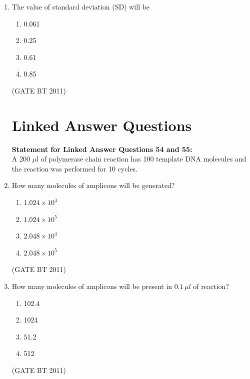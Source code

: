 \documentclass[journal,12pt,onecolumn]{IEEEtran}
\begin{document}
\begin{enumerate}
  \item The value of standard deviation (SD) will be

  \begin{multicols}{4}
    \begin{enumerate}
      \item 0.061
      \item 0.25
      \item 0.61
      \item 0.85
    \end{enumerate}
  \end{multicols} \hfill(GATE BT 2011)

\section*{Linked Answer Questions}

\textbf{Statement for Linked Answer Questions 54 and 55:} \\
A 200 $\mu$l of polymerase chain reaction has 100 template DNA molecules and the reaction was performed for 10 cycles.

\setcounter{enumi}{53}

  \item How many molecules of amplicons will be generated?
  \begin{multicols}{4}
    \begin{enumerate}
      \item $1.024 \times 10^4$
      \item $1.024 \times 10^5$
      \item $2.048 \times 10^4$
      \item $2.048 \times 10^5$
    \end{enumerate}
    \end{multicols} \hfill(GATE BT 2011)

  \item How many molecules of amplicons will be present in $0.1 \, \mu l$ of reaction?
  \begin{multicols}{4}
    \begin{enumerate}
      \item 102.4
      \item 1024
      \item 51.2
      \item 512
\end{enumerate}
\end{multicols} \hfill(GATE BT 2011)


\end{enumerate}
\end{document}
